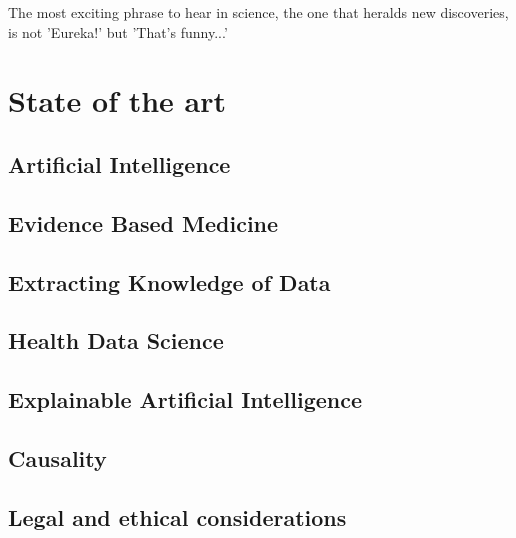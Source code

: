 \begin{savequote}[75mm]
The most exciting phrase to hear in science, the one that heralds new discoveries, is not 'Eureka!' but 'That's funny...'
\end{savequote}

\chapter{State of the art} \label{chap:sota}


\section{Artificial Intelligence}


\section{Evidence Based Medicine}\label{subsec:ebm}




\section{Extracting Knowledge of Data}\label{sec:kdd}



\section{Health Data Science}



\section{Explainable Artificial Intelligence}\label{subsec:xai}




\section{Causality}\label{causalml}




\section{Legal and ethical considerations}


